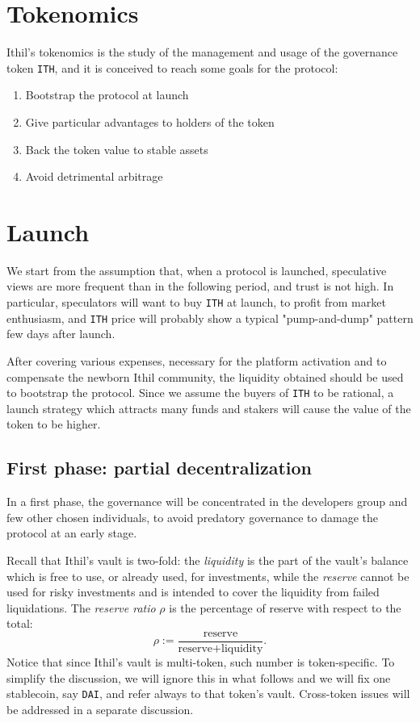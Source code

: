 \documentclass[a4paper,10 pt]{article}
\theoremstyle{definition}
\begin{document}
\section{Tokenomics}
Ithil's tokenomics is the study of the management and usage of the governance token \verb|ITH|, and it is conceived to reach some goals for the protocol:
\begin{enumerate}
\item Bootstrap the protocol at launch
\item Give particular advantages to holders of the token
\item Back the token value to stable assets
\item Avoid detrimental arbitrage
\end{enumerate}

\section{Launch}\label{launch}

We start from the assumption that, when a protocol is launched, speculative views are more frequent than in the following period, and trust is not high. In particular, speculators will want to buy \verb|ITH| at launch, to profit from market enthusiasm, and \verb|ITH| price will probably show a typical "pump-and-dump" pattern few days after launch.

After covering various expenses, necessary for the platform activation and to compensate the newborn Ithil community, the liquidity obtained should be used to bootstrap the protocol. Since we assume the buyers of \verb|ITH| to be rational, a launch strategy which attracts many funds and stakers will cause the value of the token to be higher.

\subsection{First phase: partial decentralization}
In a first phase, the governance will be concentrated in the developers group and few other chosen individuals, to avoid predatory governance to damage the protocol at an early stage.

Recall that Ithil's vault is two-fold: the {\it liquidity} is the part of the vault's balance which is free to use, or already used, for investments, while the {\it reserve} cannot be used for risky investments and is intended to cover the liquidity from failed liquidations. The {\it reserve ratio} $\rho$ is the percentage of reserve with respect to the total:
$$\rho := \frac{\text{reserve}}{\text{reserve} + \text{liquidity}}.$$
Notice that since Ithil's vault is multi-token, such number is token-specific. To simplify the discussion, we will ignore this in what follows and we will fix one stablecoin, say \verb|DAI|, and refer always to that token's vault. Cross-token issues will be addressed in a separate discussion.
\end{document}
